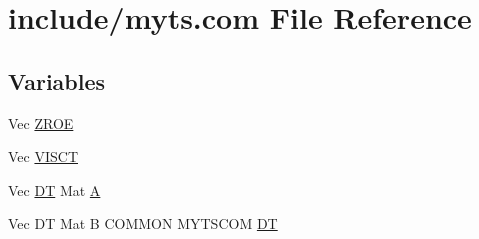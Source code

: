 \hypertarget{home_2abonfi_2_c_f_d__codes_2_eul_f_s_83_84_2include_2myts_8com}{\section{include/myts.com File Reference}
\label{home_2abonfi_2_c_f_d__codes_2_eul_f_s_83_84_2include_2myts_8com}
}
\subsection*{Variables}
\begin{DoxyCompactItemize}
\item 
Vec \hyperlink{home_2abonfi_2_c_f_d__codes_2_eul_f_s_83_84_2include_2myts_8com_a0c4fbcdb78e6b50c8919d714e4b5a694}{Z\-R\-O\-E}
\item 
Vec \hyperlink{home_2abonfi_2_c_f_d__codes_2_eul_f_s_83_84_2include_2myts_8com_accf7addb2159476a2ff0ba7d99b8bbbc}{V\-I\-S\-C\-T}
\item 
Vec \hyperlink{msa20_2home_2abonfi_2_c_f_d__codes_2_eul_f_s_83_82_83_2include_2myts_8com_a41549d5ede5e2b840495daf35608da41}{D\-T} Mat \hyperlink{home_2abonfi_2_c_f_d__codes_2_eul_f_s_83_84_2include_2myts_8com_a04f74f75c95694d7f2517b1ad1bb88fc}{A}
\item 
Vec D\-T Mat B C\-O\-M\-M\-O\-N M\-Y\-T\-S\-C\-O\-M \hyperlink{home_2abonfi_2_c_f_d__codes_2_eul_f_s_83_84_2include_2myts_8com_a41549d5ede5e2b840495daf35608da41}{D\-T}
\end{DoxyCompactItemize}


